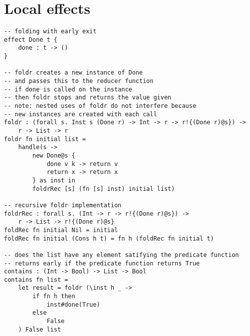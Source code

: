 \section{Local effects}
\begin{verbatim}
-- folding with early exit
effect Done t {
	done : t -> ()
}

-- foldr creates a new instance of Done
-- and passes this to the reducer function
-- if done is called on the instance
-- then foldr stops and returns the value given
-- note: nested uses of foldr do not interfere because
-- new instances are created with each call
foldr : (forall s. Inst s (Done r) -> Int -> r -> r!{(Done r)@s}) ->
	r -> List -> r
foldr fn initial list =
	handle(s ->
		new Done@s {
			done v k -> return v
			return x -> return x
		} as inst in
		foldrRec [s] (fn [s] inst) initial list)

-- recursive foldr implementation
foldrRec : forall s. (Int -> r -> r!{(Done r)@s}) ->
	r -> List -> r!{(Done r)@s}
foldRec fn initial Nil = initial
foldRec fn initial (Cons h t) = fn h (foldRec fn initial t)

-- does the list have any element satifying the predicate function
-- returns early if the predicate function returns True
contains : (Int -> Bool) -> List -> Bool
contains fn list =
	let result = foldr (\inst h _ ->
		if fn h then
			inst#done(True)
		else
			False
	) False list
\end{verbatim}

